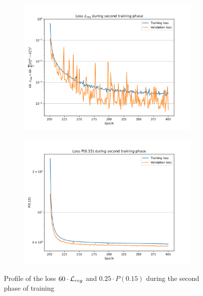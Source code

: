 \documentclass[../main.tex]{subfiles}
\begin{document}
\begin{figure}[ht]
  \centering
  \begin{subfigure}[t]{0.48\linewidth}
    \includegraphics[width=\linewidth]{images/janne/training/phase_2_loss_reg.png}
  \end{subfigure}
  \hfill
  \begin{subfigure}[t]{0.48\linewidth}
    \includegraphics[width=\linewidth]{images/janne/training/phase_2_penal.png}
  \end{subfigure}
  \caption{Profile of the loss $60 \cdot {\cal L}_{reg}$ and $0.25 \cdot P(0.15)$ during the second phase of training}
  \label{fig:janne:phase_2_2}
\end{figure}
\end{document}
